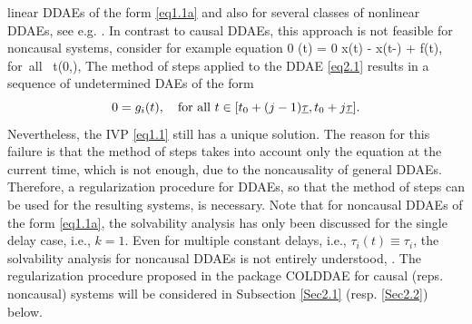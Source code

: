 \documentclass[final,reqno]{siamltex}
\begin{document}
linear DDAEs of the form \eqref{eq1.1a} and also for several classes of nonlinear DDAEs, see e.g. \cite{AscP95,BakPT02,GugH07,Hau97,ShaG06}.
In contrast to causal DDAEs, this approach is not feasible for noncausal systems,
consider for example equation 
%
\be\label{eq2.1}
  0 \cdot {}(t) = 0 \cdot x(t) - x(t-\tau) + f(t), \quad \mbox{for all } t\in (0,\infty),
\ee
%
The method of steps applied to the DDAE \eqref{eq2.1} results in a sequence of undetermined DAEs of the form
%
\[
 0 = g_i(t), \quad \mbox{for all } t \in [t_0+(j-1)\underline{\tau},t_0+j\underline{\tau}]. 
\]
%
Nevertheless, the IVP \eqref{eq1.1} still has a unique solution. 
The reason for this failure is that the method of steps takes into account only the equation at the current time, which is not enough, 
due to the noncausality of general DDAEs. Therefore, a regularization procedure for DDAEs, so that the method of steps can be used for the resulting systems, is 
necessary. Note that for noncausal DDAEs of the form \eqref{eq1.1a}, the solvability analysis has only been discussed for 
the single delay case, i.e., $k=1$. Even for multiple constant delays, i.e., $\tau_i(t) \equiv \tau_i$, the solvability analysis for noncausal DDAEs 
is not entirely understood, \cite{HaM14,Ha15}. 
The regularization procedure proposed in the package COLDDAE for causal (reps. noncausal) systems will be considered in Subsection \ref{Sec2.1} (resp. \ref{Sec2.2}) below.
\end{document}
